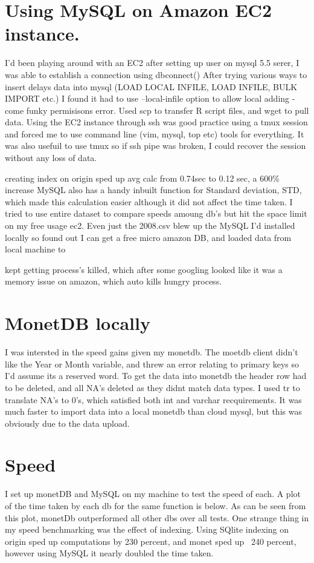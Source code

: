 \documentclass[12pt]{article}
\begin{document}
	\section{Using MySQL on Amazon EC2 instance.}
		I'd been playing around with an EC2
		after setting up user on mysql 5.5 serer, I was able to establish a connection using dbconnect() 
		After trying various ways to insert delays data into mysql (LOAD LOCAL INFILE, LOAD INFILE, BULK IMPORT etc.) I found it 
		had to use --local-infile option to allow local adding - come funky permisisons error.
		Used scp to transfer R script files, and wget to pull data.
		Using the EC2 instance through ssh was good practice using a tmux session and forced me to use command line (vim, mysql, top etc) tools for everything. It was also usefuil to use tmux so if ssh pipe was broken, I could recover the session without any loss of data. 

		creating index on origin sped up avg calc from 0.74sec to 0.12 sec, a 600\% increase
		MySQL also has a handy inbuilt function for Standard deviation, STD, which made this calculation easier although it did not affect the time taken.
		I tried to use entire dataset to compare speeds amoung db's but hit the space limit on my free usage ec2.
		Even just the 2008.csv blew up the MySQL I'd installed locally so found out I can get a free micro amazon DB, and loaded data from local machine to 

		kept getting process's killed, which after some googling looked like it was a memory issue on amazon, which auto kills hungry process.
	\section{MonetDB locally}
		I was intersted in the speed gains given my monetdb.
		The moetdb client didn't like the Year or Month variable, and threw an error relating to primary keys so I'd assume its a reserved word.
		To get the data into monetdb the header row had to be deleted, and all NA's deleted as they didnt match data types. I used tr to translate NA's to 0's, which satisfied both int and varchar recquirements. 
		It was much faster to import data into a local monetdb than cloud mysql, but this was obviously due to the data upload.
	\section{Speed}
		I set up monetDB and MySQL on my machine to test the speed of each.
		A plot of the time taken by each db for the same function is below.
		As can be seen from this plot, monetDb outperformed all other dbs over all tests.
		One strange thing in my speed benchmarking was the effect of indexing. Using SQlite indexing on origin sped up computations by 230 percent, and monet sped up ~240 percent, however using MySQL it nearly doubled the time taken.
\end{document}
